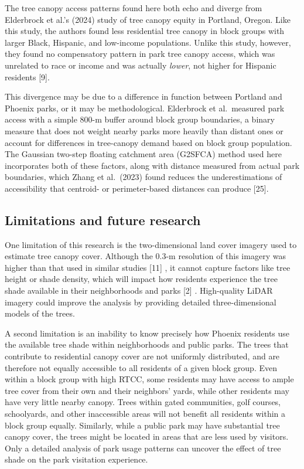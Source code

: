 \documentclass[
  sn-basic,
]{sn-jnl}
\begin{document}
The tree canopy access patterns found here both echo and diverge from
Elderbrock et al.'s (2024) study of tree canopy equity in Portland,
Oregon. Like this study, the authors found less residential tree canopy
in block groups with larger Black, Hispanic, and low-income populations.
Unlike this study, however, they found no compensatory pattern in park
tree canopy access, which was unrelated to race or income and was
actually \emph{lower}, not higher for Hispanic residents {[}9{]}.

This divergence may be due to a difference in function between Portland
and Phoenix parks, or it may be methodological. Elderbrock et
al.~measured park access with a simple 800-m buffer around block group
boundaries, a binary measure that does not weight nearby parks more
heavily than distant ones or account for differences in tree-canopy
demand based on block group population. The Gaussian two-step floating
catchment area (G2SFCA) method used here incorporates both of these
factors, along with distance measured from actual park boundaries, which
Zhang et al.~(2023) found reduces the underestimations of accessibility
that centroid- or perimeter-based distances can produce {[}25{]}.

\subsection{Limitations and future research}\label{sec-disc-limit}

One limitation of this research is the two-dimensional land cover
imagery used to estimate tree canopy cover. Although the 0.3-m
resolution of this imagery was higher than that used in similar studies
{[}11{]} , it cannot capture factors like tree height or shade density,
which will impact how residents experience the tree shade available in
their neighborhoods and parks {[}2{]} . High-quality LiDAR imagery could
improve the analysis by providing detailed three-dimensional models of
the trees.

A second limitation is an inability to know precisely how Phoenix
residents use the available tree shade within neighborhoods and public
parks. The trees that contribute to residential canopy cover are not
uniformly distributed, and are therefore not equally accessible to all
residents of a given block group. Even within a block group with high
RTCC, some residents may have access to ample tree cover from their own
and their neighbors' yards, while other residents may have very little
nearby canopy. Trees within gated communities, golf courses,
schoolyards, and other inaccessible areas will not benefit all residents
within a block group equally. Similarly, while a public park may have
substantial tree canopy cover, the trees might be located in areas that
are less used by visitors. Only a detailed analysis of park usage
patterns can uncover the effect of tree shade on the park visitation
experience.
\end{document}

